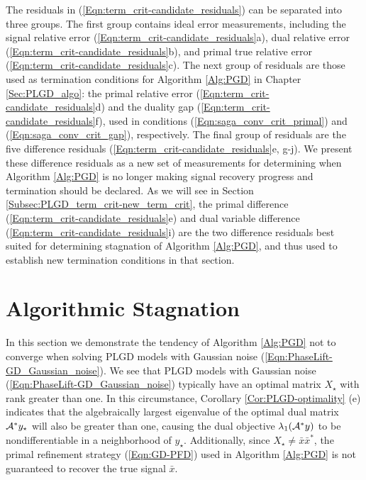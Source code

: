 The residuals in (\ref{Eqn:term_crit-candidate_residuals}) can be separated into three groups.   
The first group contains ideal error measurements, including the signal relative error (\ref{Eqn:term_crit-candidate_residuals}a), dual relative error (\ref{Eqn:term_crit-candidate_residuals}b), and primal true relative error (\ref{Eqn:term_crit-candidate_residuals}c).
The next group of residuals are those used as termination conditions for Algorithm \ref{Alg:PGD} in Chapter \ref{Sec:PLGD_algo}: the primal relative error (\ref{Eqn:term_crit-candidate_residuals}d) and the duality gap (\ref{Eqn:term_crit-candidate_residuals}f), used in conditions (\ref{Eqn:saga_conv_crit_primal}) and (\ref{Eqn:saga_conv_crit_gap}), respectively.
The final group of residuals are the five difference residuals (\ref{Eqn:term_crit-candidate_residuals}e, g-j).
We present these difference residuals as a new set of measurements for determining when Algorithm \ref{Alg:PGD} is no longer making signal recovery progress and termination should be declared.
As we will see in Section \ref{Subsec:PLGD_term_crit-new_term_crit}, the primal difference (\ref{Eqn:term_crit-candidate_residuals}e) and dual variable difference (\ref{Eqn:term_crit-candidate_residuals}i) are the two difference residuals best suited for determining stagnation of Algorithm \ref{Alg:PGD}, and thus used to establish new termination conditions in that section.









\section{Algorithmic Stagnation} 		\label{Subsec:PLGD_term_crit-stagnation}





In this section we demonstrate the tendency of Algorithm \ref{Alg:PGD} not to converge when solving PLGD models with Gaussian noise (\ref{Eqn:PhaseLift-GD_Gaussian_noise}).  
We see that PLGD models with Gaussian noise (\ref{Eqn:PhaseLift-GD_Gaussian_noise}) typically have an optimal matrix $X_\star$ with rank greater than one.  
In this circumstance, Corollary \ref{Cor:PLGD-optimality} (e) indicates that the algebraically largest eigenvalue of the optimal dual matrix ${\mathcal A}^*y_\star$ will also be greater than one, causing the dual objective $\lambda_1({\mathcal A}^*y)$ to be nondifferentiable in a neighborhood of $y_\star$.  
Additionally, since $X_\star \neq \bar{x}\bar{x}^*$, the primal refinement strategy (\ref{Eqn:GD-PFD}) used in Algorithm \ref{Alg:PGD} is not guaranteed to recover the true signal $\bar{x}$.


